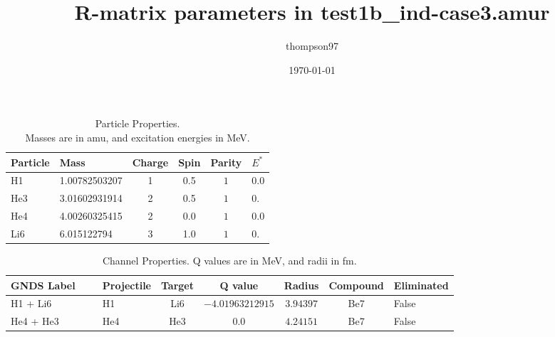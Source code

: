 \documentclass[aps]{revtex4}
\begin{document}
\title{ R-matrix parameters in test1b\_ind-case3.amur }
\author{thompson97} 
\date{ \today }
\maketitle
         
\begin{table}[h] 
\caption{ Particle Properties. \\ Masses are in amu, and excitation energies in MeV. } 
\begin{tabular}{| llcc c l |} 
\hline\hline 
Particle & Mass & Charge & Spin & Parity & $E^*$  \\ 
\hline 
 H1 & 1.00782503207 & 1 & 0.5 & $1$ & $0.0$ \\ 
 He3 & 3.01602931914 & 2 & 0.5 & $1$ & $0.$ \\ 
 He4 & 4.00260325415 & 2 & 0.0 & $1$ & $0.0$ \\ 
 Li6 & 6.015122794 & 3 & 1.0 & $1$ & $0.$ \\ 
\hline
 \end{tabular}
 \end{table}

 
\begin{table}[h] 
\caption{ Channel Properties. Q values are in MeV, and radii in fm.} 
\begin{tabular}{| llccc c l |} 
\hline\hline 
GNDS Label~~~   & Projectile & Target & Q value  & Radius & Compound & Eliminated  \\ 
\hline 
 H1 + Li6 & H1 & Li6 & $-4.01963212915$ & $3.94397$ & Be7 & False \\ 
 He4 + He3 & He4 & He3 & $0.0$ & $4.24151$ & Be7 & False \\ 
\hline
 \end{tabular}
 \end{table}
\end{document}
